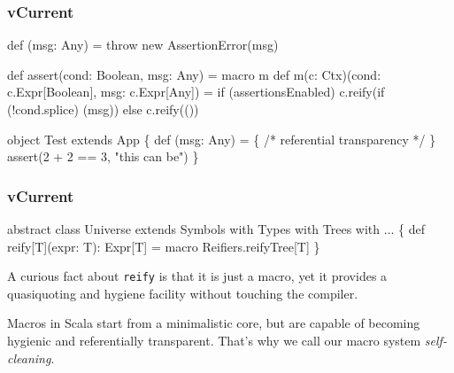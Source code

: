 \documentclass[hyperref={bookmarks=false}]{beamer}
\begin{document}
\begin{frame}[fragile]
\frametitle{vCurrent}

\begin{lstlistinglike}
\begin{semiverbatim}
def (msg: Any) = throw new AssertionError(msg)

def assert(cond: Boolean, msg: Any) = macro m
def m(c: Ctx)(cond: c.Expr[Boolean], msg: c.Expr[Any]) =
  if (assertionsEnabled)
    \alert<1>{c.reify(}if (!cond\alert<1>{.splice}) (msg)\alert<1>{)}
  else
    \alert<1>{c.reify(}()\alert<1>{)}

object Test extends App \{
  def (msg: Any) = \{ /* referential transparency */ \}
  assert(2 + 2 == 3, "this can be")
\}
\end{semiverbatim}
\end{lstlistinglike}


\end{frame}

\begin{frame}[fragile]
\frametitle{vCurrent}

\begin{lstlistinglike}
\begin{semiverbatim}
abstract class Universe extends Symbols
                           with Types
                           with Trees
                           with ...
\{
  def \alert<1>{reify}[T](expr: T): Expr[T] =
    \alert<1>{macro} Reifiers.reifyTree[T]
\}
\end{semiverbatim}
\end{lstlistinglike}

A curious fact about \texttt{reify} is that it is just a macro,
yet it provides a quasiquoting and hygiene facility without touching the compiler.

Macros in Scala start from a minimalistic core, but are capable of
becoming hygienic and referentially transparent. That's why we call our
macro system \emph{self-cleaning}.
\end{frame}
\end{document}
